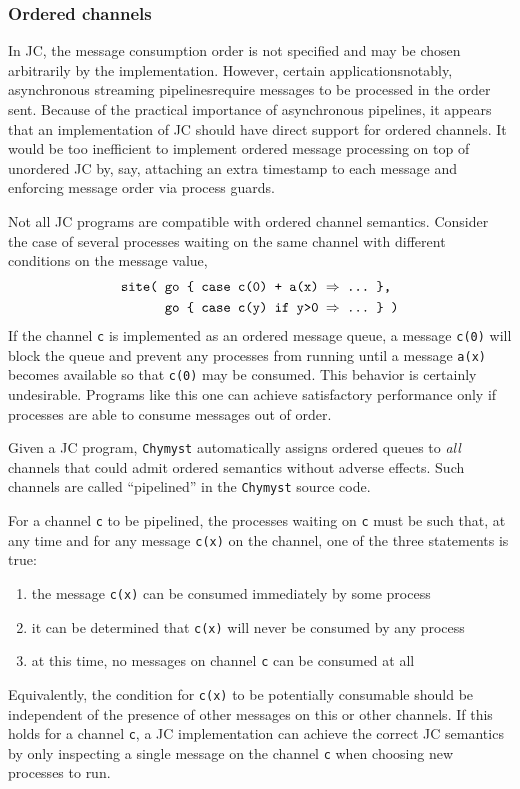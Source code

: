 \documentclass[sigplan,10pt,review,anonymous]{acmart}\settopmatter{printfolios=true}
\begin{document}
\subsubsection{Ordered channels}

In JC, the message consumption order is not specified and may be chosen
arbitrarily by the implementation. However, certain applications\textemdash notably,
asynchronous streaming pipelines\textemdash require messages to be
processed in the order sent. Because of the practical importance of
asynchronous pipelines, it appears that an implementation of JC should
have direct support for ordered channels. It would be too inefficient
to implement ordered message processing on top of unordered JC by,
say, attaching an extra timestamp to each message and enforcing message
order via process guards.

Not all JC programs are compatible with ordered channel semantics.
Consider the case of several processes waiting on the same channel
with different conditions on the message value, 
\begin{align*}
\text{\texttt{site( }} & \text{\texttt{go \{ case c(0) + a(x) \ensuremath{\Rightarrow} ...~\},}}\\
 & \text{\text{\texttt{go \{ case c(y) if y>0 }}\texttt{\ensuremath{\Rightarrow} ...~\} )}}
\end{align*}
If the channel \texttt{c} is implemented as an ordered message queue,
a message \texttt{c(0)} will block the queue and prevent any processes
from running until a message \texttt{a(x)} becomes available so that
\texttt{c(0)} may be consumed. This behavior is certainly undesirable.
Programs like this one can achieve satisfactory performance only if
processes are able to consume messages out of order.

Given a JC program, \texttt{Chymyst} automatically assigns ordered
queues to \emph{all} channels that could admit ordered semantics without
adverse effects. Such channels are called ``pipelined'' in the \texttt{Chymyst}
source code.

For a channel \texttt{c} to be pipelined, the processes waiting on
\texttt{c} must be such that, at any time and for any message \texttt{c(x)}
on the channel, one of the three statements is true:
\begin{enumerate}
\item the message \texttt{c(x)} can be consumed immediately by some process
\item it can be determined that \texttt{c(x)} will never be consumed by
any process
\item at this time, no messages on channel \texttt{c} can be consumed at
all
\end{enumerate}
Equivalently, the condition for \texttt{c(x)}
to be potentially consumable should be independent of the presence of other
messages on this or other channels. If this holds for
a channel \texttt{c}, a JC implementation can achieve the correct
JC semantics by only inspecting a single message on the channel \texttt{c}
when choosing new processes to run.
\end{document}
